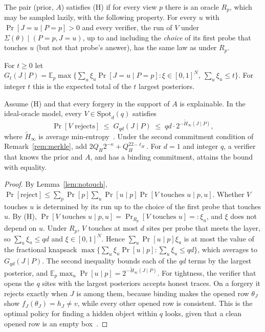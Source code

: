 \begin{definition}
\label{def:H}
The pair (prior, $A$) satisfies (H) if for every view $p$ there is an oracle $R_p$, which may be
sampled lazily, with the following property. For every $u$ with $\Pr[J=u\mid P=p]>0$ and every
verifier, the run of $V$ under $\Sigma(\theta)\mid(P=p,J=u)$, up to and including the
\emph{choice} of its first probe that touches $u$ (but not that probe's answer), has the same law
as under $R_p$.
\end{definition}

\noindent For $t\ge0$ let $G_t(J\mid P)=\mathbb E_p\max\{\sum_u \xi_u\Pr[J=u\mid P=p] :
\xi\in[0,1]^N,\ \sum_u \xi_u\le t\}$. For integer $t$ this is the expected total of the $t$ largest
posteriors.

\begin{theorem}
\label{thm:guess-full}
Assume (H) and that every forgery in the support of $A$ is explainable. In the ideal-oracle model,
every $V\in\mathrm{Spot}_d(q)$ satisfies
\[
  \Pr[V\text{ rejects}] \;\le\; G_{qd}(J\mid P)\;\le\; qd\cdot 2^{-\tilde H_\infty(J\mid P)} ,
\]
where $\tilde H_\infty$ is average min-entropy~\cite{dodis2008fuzzy}. Under the second commitment
condition of Remark~\ref{rem:merkle}, add $2Q_H2^{-\kappa}+Q_H^22^{-\ell_H}$. For $d=1$ and integer $q$,
a verifier that knows the prior and $A$, and has a binding commitment, attains the bound with
equality.
\end{theorem}
\begin{proof}
By Lemma~\ref{lem:notouch},
$\Pr[\text{reject}]\le\sum_p\Pr[p]\sum_u\Pr[u\mid p]\Pr[V\text{ touches }u\mid p,u]$. Whether $V$
touches $u$ is determined by its run up to the choice of the first probe that touches $u$. By (H),
$\Pr[V\text{ touches }u\mid p,u]=\Pr_{R_p}[V\text{ touches }u]=:\xi_u$, and $\xi$ does not depend on
$u$. Under $R_p$, $V$ touches at most $d$ sites per probe that meets the layer, so
$\sum_u \xi_u\le qd$ and $\xi\in[0,1]^N$. Hence $\sum_u\Pr[u\mid p]\xi_u$ is at most the value of the
fractional knapsack $\max\{\sum_u \xi_u\Pr[u\mid p]:\sum_u \xi_u\le qd\}$, which averages to
$G_{qd}(J\mid P)$. The second inequality bounds each of the $qd$ terms by the largest posterior,
and $\mathbb E_p\max_u\Pr[u\mid p]=2^{-\tilde H_\infty(J\mid P)}$. For tightness, the verifier that
opens the $q$ sites with the largest posteriors accepts honest traces. On a forgery it rejects
exactly when $J$ is among them, because binding makes the opened row $\theta_J$ show
$f_J(\theta_J)=h_J\neq v$, while every other opened row is consistent. This is the optimal policy
for finding a hidden object within $q$ looks, given that a clean opened row is an empty
box~\cite{chew1967,kadane1971}.
\end{proof}


